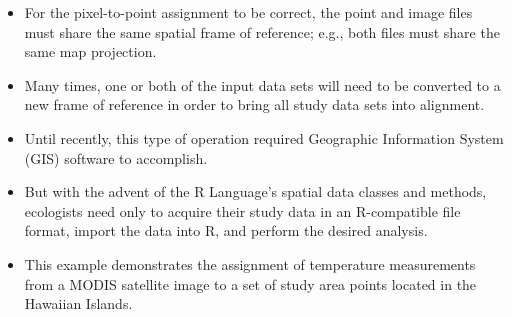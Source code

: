 \documentclass{beamer}
\begin{document}
\begin{frame}
\begin{itemize}
\item For the pixel-to-point assignment to be correct, the point and image files must share the same spatial frame of reference; e.g., both files must share the same map projection. \item Many times, one or both of the input data sets will need to be converted to a new frame of reference in order to bring all study data sets into alignment.
\end{itemize}
\end{frame}

\begin{frame}
\begin{itemize}
\item Until recently, this type of operation required Geographic Information System (GIS) software to accomplish. \item  But with the advent of the R Language's spatial data classes and methods, ecologists need only to acquire their study data in an R-compatible file format, import the data into R, and perform the desired analysis.
\end{itemize}
\end{frame}

\begin{frame}
\begin{itemize}
\item This example demonstrates the assignment of temperature measurements from a MODIS satellite image to a set of study area points located in the Hawaiian Islands.
\end{itemize}
\end{frame}
\end{document}
